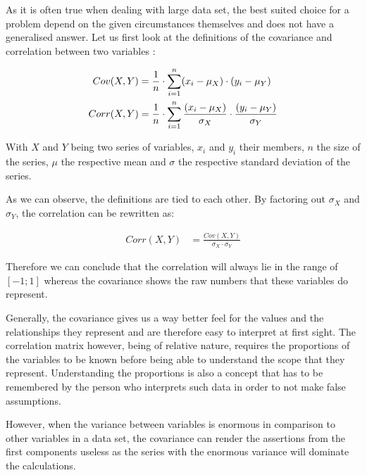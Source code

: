 As it is often true when dealing with large data set, the best suited choice for a problem depend on the given circumstances themselves and does not have a generalised answer. Let us first look at the definitions of the covariance and correlation between two variables \cite{downey2011think}:

\vspace{-28mm}
{
\begin{align}
	\label{formula:covariance}
	Cov(X,Y) &= \frac{1}{n} \cdot \displaystyle\sum_{i=1}^{n} (x_i - \mu_X)\cdot(y_i - \mu_Y)\bigskip
	\\
	\label{formula:correlation}
	Corr(X,Y) &= \frac{1}{n} \cdot \displaystyle\sum_{i=1}^{n} \frac{(x_i - \mu_X)}{\sigma_X}\cdot\frac{(y_i - \mu_Y)}{\sigma_Y}
\end{align}
}

\vspace{-10mm}
With $X$ and $Y$ being two series of variables, $x_i$ and $y_i$ their members, $n$ the size of the series, $\mu$ the respective mean and $\sigma$ the respective standard deviation of the series.

As we can observe, the definitions are tied to each other. By factoring out $\sigma_X$ and $\sigma_Y$, the correlation can be rewritten as:

\vspace{-6mm}
\begin{align}
	\label{formula:covarianceFTcorrelation}
	Corr(X,Y) &= \frac{Cov(X,Y)}{\sigma_X \cdot \sigma_Y}
\end{align}

Therefore we can conclude that the correlation will always lie in the range of $[-1;1]$ whereas the covariance shows the raw numbers that these variables do represent.\bigskip


Generally, the covariance gives us a way better feel for the values and the relationships they represent and are therefore easy to interpret at first sight.
The correlation matrix however, being of relative nature, requires the proportions of the variables to be known before being able to understand the scope that they represent.
Understanding the proportions is also a concept that has to be remembered by the person who interprets such data in order to not make false assumptions.

However, when the variance between variables is enormous in comparison to other variables in a data set, the covariance can render the assertions from the first components useless as the series with the enormous variance will dominate the calculations.

